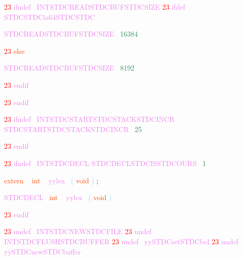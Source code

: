 \documentclass[8, usernames, dvipsnames]{beamer}
\begin{document}
\begin{frame}

  \textcolor{Red}{23}
\textcolor{Violet}{ifndef}\textcolor{White}{\ }
\textcolor{Violet}{INTSTDCREADSTDCBUFSTDCSIZE}
  \textcolor{Red}{23}
\textcolor{Violet}{ifdef}\textcolor{White}{\ }
\textcolor{Violet}{STDCSTDCia64STDCSTDC}
 
 \textcolor{Violet}{STDCREADSTDCBUFSTDCSIZE}\textcolor{White}{\ }
\textcolor{SeaGreen}{16384}

  \textcolor{Red}{23}
\textcolor{OrangeRed}{else}

 \textcolor{Violet}{STDCREADSTDCBUFSTDCSIZE}\textcolor{White}{\ }
\textcolor{SeaGreen}{8192}

  \textcolor{Red}{23}
\textcolor{Violet}{endif}\textcolor{White}{\ }

  \textcolor{Red}{23}
\textcolor{Violet}{endif}
 
 \end{frame}
\begin{frame}

  \textcolor{Red}{23}
\textcolor{Violet}{ifndef}\textcolor{White}{\ }
\textcolor{Violet}{INTSTDCSTARTSTDCSTACKSTDCINCR}
 \textcolor{Violet}{STDCSTARTSTDCSTACKSTDCINCR}\textcolor{White}{\ }
\textcolor{SeaGreen}{25}

  \textcolor{Red}{23}
\textcolor{Violet}{endif}
 
 
  \textcolor{Red}{23}
\textcolor{Violet}{ifndef}\textcolor{White}{\ }
\textcolor{Violet}{INTSTDCDECL}
 \textcolor{Violet}{STDCDECLSTDCISSTDCOURS}\textcolor{White}{\ }
\textcolor{SeaGreen}{1}

 
 \textcolor{OrangeRed}{extern}
\textcolor{White}{\ }
\textcolor{OrangeRed}{int}
\textcolor{White}{\ }
\textcolor{Violet}{yylex}\textcolor{White}{\ }
\textcolor{SkyBlue}{(}
\textcolor{OrangeRed}{void}
\textcolor{SkyBlue}{)}
\textcolor{Sepia}{;}

 \end{frame}
\begin{frame}

 \textcolor{Violet}{STDCDECL}\textcolor{White}{\ }
\textcolor{OrangeRed}{int}
\textcolor{White}{\ }
\textcolor{Violet}{yylex}\textcolor{White}{\ }
\textcolor{SkyBlue}{(}
\textcolor{OrangeRed}{void}
\textcolor{SkyBlue}{)}

  \textcolor{Red}{23}
\textcolor{Violet}{endif}\textcolor{White}{\ }

 
 
 
  \textcolor{Red}{23}
\textcolor{Violet}{undef}\textcolor{White}{\ }
\textcolor{Violet}{INTSTDCNEWSTDCFILE}
  \textcolor{Red}{23}
\textcolor{Violet}{undef}\textcolor{White}{\ }
\textcolor{Violet}{INTSTDCFLUSHSTDCBUFFER}
  \textcolor{Red}{23}
\textcolor{Violet}{undef}\textcolor{White}{\ }
\textcolor{Violet}{yySTDCsetSTDCbol}
  \textcolor{Red}{23}
\textcolor{Violet}{undef}\textcolor{White}{\ }
\textcolor{Violet}{yySTDCnewSTDCbuffer}
 \end{frame}
\end{document}
